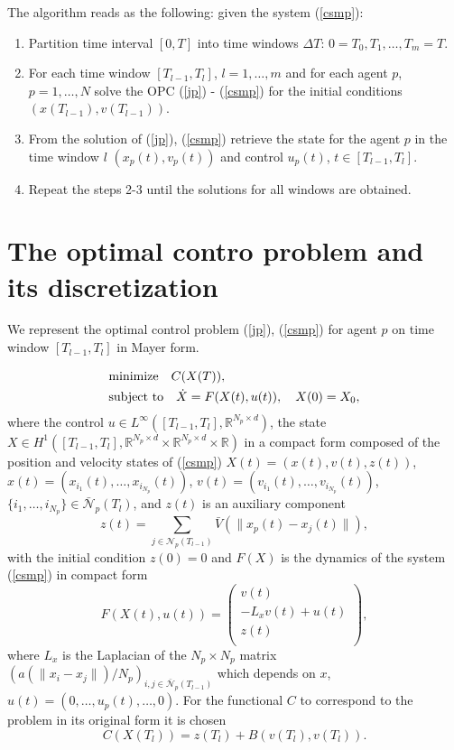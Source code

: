\documentclass[a4paper,10pt, english]{article}
\newcommand{\D}{\displaystyle}
\begin{document}
   The algorithm reads as the following: given the system (\ref{csmp}):
   \begin{enumerate}
   \item Partition time interval $[0, T]$ into time windows $\Delta T$: $0 = T_0, T_1, \dots, T_m = T$.
   \item For each time window  $[T_{l-1}, T_{l}]$, $l = 1, \dots, m$ and for each agent $p$, $p = 1, \dots, N$  solve the OPC (\ref{jp}) - (\ref{csmp}) for the initial conditions $(x(T_{l-1}), v(T_{l-1}))$.
   \item From the solution of (\ref{jp}), (\ref{csmp})  retrieve the  state for the agent $p$ in the time window $l$ $(x_p(t), v_p(t))$ and control $u_p(t)$, $t\in [T_{l-1}, T_{l}]$.
   \item Repeat the steps 2-3 until the solutions for all windows are obtained. 
 \end{enumerate}
 



 
 
 \section{The optimal contro problem and its discretization}
  We represent the optimal control problem  (\ref{jp}), (\ref{csmp}) for agent $p$ on time window $[T_{l-1}, T_{l}]$ in Mayer form.
  
 \begin{align}
 \D
 & \mbox{minimize}\quad  C(X(T)),   \label{compact_cost} \\ 
 & \mbox{subject to} \quad \dot{X} = F(X(t), u(t)), \quad X(0) = X_0, \label{compact_equation}
 \end{align}
where  the control $u \in  L^{\infty}([T_{l-1}, T_{l}], \mathbb{R}^{N_p \times d})$,
the state $X\in H^1([T_{l-1}, T_{l}], \mathbb{R}^{N_p \times d} \times \mathbb{R}^{N_p\times d} \times \mathbb{R})$
in a compact form composed of the position and velocity 
states of (\ref{csmp})   $X(t) = (x(t), v(t), z(t))$, $x(t) = (x_{i_1}(t), \dots, x_{i_{N_p}}(t))$,
 $v(t) = (v_{i_1}(t), \dots, v_{i_{N_p}}(t))$, $\{i_1, \dots, i_{N_p}\} \in \bar{\mathcal{N}}_p(T_l)$, 
 and $z(t)$ is an auxiliary component 
 $$
 z(t) =  \sum_{j\in \mathcal{N}_p(T_{l-1})} \bar{V}(\|x_p(t) - x_j(t)\|),
 $$
 with the initial condition $z(0) = 0$ and $F(X)$ is the dynamics of the system (\ref{csmp}) in compact form
 $$
 F(X(t), u(t)) =
  \left( 
  \begin{array}{c}
  v(t)\\
   - L_xv(t) + u(t)\\
   z(t)\\
 \end{array} 
 \right), 
 $$
 where $L_x$ is the Laplacian of the $N_p\times N_p$ matrix $(a(\|x_i - x_j\|)/N_p)_{i, j\in\bar{\mathcal{N}}_p(T_{l-1})}$ which depends on $x$, $u(t) = (0, \dots, u_p(t), \dots, 0)$.
 For the functional $C$ to correspond to the problem in its original form it is chosen 
 $$
 C(X(T_l)) = z(T_l) + B(v(T_l), v(T_l)).
 $$
 
\end{document}
